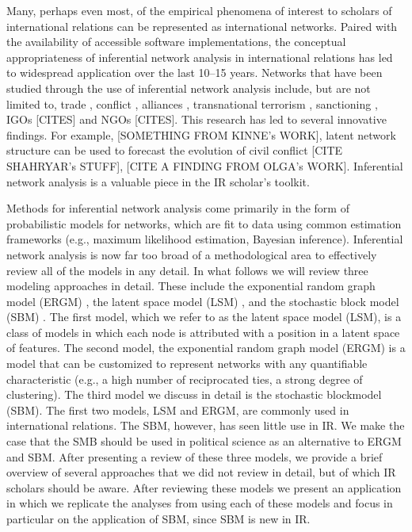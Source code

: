 \documentclass[fleqn,12pt]{wlscirep}
\begin{document}
Many, perhaps even most, of the empirical phenomena of interest to scholars of international relations can be represented as international networks. Paired with the availability of accessible software implementations, the conceptual appropriateness of inferential network analysis in international relations has led to widespread application over the last 10--15 years. Networks that have been studied through the use of inferential network analysis include, but are not limited to, trade \citep{ward2007persistent,agiolo2014does,chu2010homogenization,chyzh2016dangerous}, conflict \citep{ward2007disputes,cranmer2011inferential,gallop2016endogenous,dorff2013networks}, alliances \citep{cranmer2012complex, }, transnational terrorism \citep{desmarais2013forecasting,asal2016friends,metternich2013antigovernment,bush2015measuring}, sanctioning \citep{cranmer2014reciprocity,dorff2017states}, IGOs \citep{cao2012global,dorussen2008intergovernmental,lupu2017networked} [CITES] and NGOs \citep{atouba2015international} [CITES]. This research has led to several innovative findings. For example, [SOMETHING FROM KINNE's WORK], latent network structure can be used to forecast the evolution of civil conflict [CITE SHAHRYAR's STUFF], [CITE A FINDING FROM OLGA's WORK]. Inferential network analysis is a valuable piece in the IR scholar's toolkit.
 
Methods for inferential network analysis come primarily in the form of probabilistic models for networks, which are fit to data using common estimation frameworks (e.g., maximum likelihood estimation, Bayesian inference). Inferential network analysis is now far too broad of a methodological area to effectively review all of the models in any detail. In what follows we will review three modeling approaches in detail. These include the exponential random graph model (ERGM) \citep{cranmer2011inferential}, the latent space model (LSM) \citep{dorff2016latent},  and the stochastic block model (SBM) \citep{latouche2011overlapping}. The first model, which we refer to as the latent space model (LSM), is a class of models in which each node is attributed with a position in a latent space of features. The second model, the exponential random graph model (ERGM) is a model that can be customized to represent networks with any quantifiable characteristic (e.g., a high number of reciprocated ties, a strong degree of clustering).  The third model we discuss in detail is the stochastic blockmodel (SBM). The first two models, LSM and ERGM, are commonly used in international relations. The SBM, however, has seen little use in IR. We make the case that the SMB should be used in political science as an alternative to ERGM and SBM. After presenting a review of these three models, we provide a brief overview of several approaches that we did not review in detail, but of which IR scholars should be aware. After reviewing these models we present an application in which we replicate the analyses from  using each of these models and focus in particular on the application of SBM, since SBM is new in IR.
\end{document}
